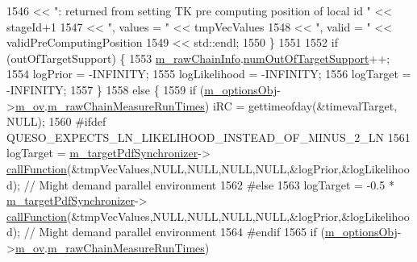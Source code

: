 \begin{DoxyCode}
1546                               << \textcolor{stringliteral}{": returned from setting TK pre computing position of local id "} << 
      stageId+1
1547                               << \textcolor{stringliteral}{", values = "} << tmpVecValues
1548                               << \textcolor{stringliteral}{", valid = "}  << validPreComputingPosition
1549                               << std::endl;
1550     \}
1551 
1552     \textcolor{keywordflow}{if} (outOfTargetSupport) \{
1553       \hyperlink{class_q_u_e_s_o_1_1_metropolis_hastings_s_g_ac531509489028853bb17c0353fc9eafd}{m\_rawChainInfo}.\hyperlink{struct_q_u_e_s_o_1_1_m_h_raw_chain_info_struct_a601f798ee4dc28cfa6b342fc04a8c841}{numOutOfTargetSupport}++;
1554       logPrior      = -INFINITY;
1555       logLikelihood = -INFINITY;
1556       logTarget     = -INFINITY;
1557     \}
1558     \textcolor{keywordflow}{else} \{
1559       \textcolor{keywordflow}{if} (\hyperlink{class_q_u_e_s_o_1_1_metropolis_hastings_s_g_a5d0bc9f73d50d272aa6bfb5ef5939ef3}{m\_optionsObj}->\hyperlink{class_q_u_e_s_o_1_1_metropolis_hastings_s_g_options_a9d4792d9fc2dc5439b8ab489b0c236eb}{m\_ov}.\hyperlink{class_q_u_e_s_o_1_1_mh_options_values_a6fcc2efc9146b68548e62d707aeed883}{m\_rawChainMeasureRunTimes}) iRC = 
      gettimeofday(&timevalTarget, NULL);
1560 \textcolor{preprocessor}{#ifdef QUESO\_EXPECTS\_LN\_LIKELIHOOD\_INSTEAD\_OF\_MINUS\_2\_LN}
1561 \textcolor{preprocessor}{}      logTarget =        \hyperlink{class_q_u_e_s_o_1_1_metropolis_hastings_s_g_ae7c7551764e0ccdfbe2862c544cdab10}{m\_targetPdfSynchronizer}->
      \hyperlink{class_q_u_e_s_o_1_1_scalar_function_synchronizer_adcdc70486ac64c11d0e505c4fb590a6b}{callFunction}(&tmpVecValues,NULL,NULL,NULL,NULL,&logPrior,&logLikelihood); \textcolor{comment}{// Might demand
       parallel environment}
1562 \textcolor{preprocessor}{#else}
1563 \textcolor{preprocessor}{}      logTarget = -0.5 * \hyperlink{class_q_u_e_s_o_1_1_metropolis_hastings_s_g_ae7c7551764e0ccdfbe2862c544cdab10}{m\_targetPdfSynchronizer}->
      \hyperlink{class_q_u_e_s_o_1_1_scalar_function_synchronizer_adcdc70486ac64c11d0e505c4fb590a6b}{callFunction}(&tmpVecValues,NULL,NULL,NULL,NULL,&logPrior,&logLikelihood); \textcolor{comment}{// Might demand
       parallel environment}
1564 \textcolor{preprocessor}{#endif}
1565 \textcolor{preprocessor}{}      \textcolor{keywordflow}{if} (\hyperlink{class_q_u_e_s_o_1_1_metropolis_hastings_s_g_a5d0bc9f73d50d272aa6bfb5ef5939ef3}{m\_optionsObj}->\hyperlink{class_q_u_e_s_o_1_1_metropolis_hastings_s_g_options_a9d4792d9fc2dc5439b8ab489b0c236eb}{m\_ov}.\hyperlink{class_q_u_e_s_o_1_1_mh_options_values_a6fcc2efc9146b68548e62d707aeed883}{m\_rawChainMeasureRunTimes}) 

\end{DoxyCode}
